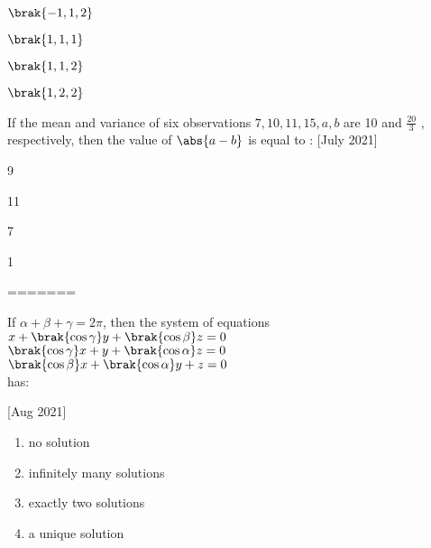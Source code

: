  \begin{enumerate}
     \begin{multicols}{2}
     \item $\brak{-1,1,2}$
     \item $\brak{1,1,1}$
     \item $\brak{1,1,2}$
     \item $\brak{1,2,2}$
     \end{multicols}
 \end{enumerate}
 \item If the mean and variance of six observations $7, 10, 11, 15, a, b $ are 10 and $\frac{20}{3}$
 , respectively, then the value of $\abs{a -
 b}$ is equal to : \hfill[July 2021]
 \begin{enumerate}
 \begin{multicols}{2}  
     \item 9
     \item 11
     \item 7
     \item 1
 \end{multicols}
 \end{enumerate}
=======
\iffalse
	\title{2021}
	\author{AI24BTECH11003}
	\section{mcq-single}
\fi

    \item If $\alpha+\beta+\gamma=2\pi$, then the system of equations\\
    $x+\brak{\cos\gamma}y+\brak{\cos\beta}z=0$\\
    $\brak{\cos\gamma}x+y+\brak{\cos\alpha}z=0$\\
    $\brak{\cos\beta}x+\brak{\cos\alpha}y+z=0$\\
    has:
    
    \hfill[Aug 2021]

        \begin{multicols}{2}
            \begin{enumerate}
                \item no solution
                \item infinitely many solutions
                \item exactly two solutions
                \item a unique solution
            \end{enumerate}
        \end{multicols}

